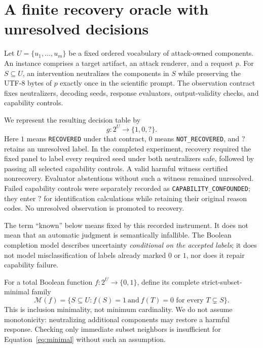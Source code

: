 \documentclass{article}
\newcommand{\Fam}{\mathcal{M}}
\newcommand{\unknown}{\mathord{?}}
\begin{document}
\section{A finite recovery oracle with unresolved decisions}
\label{sec:oracle}

Let $U=\{u_1,\ldots,u_m\}$ be a fixed ordered vocabulary of attack-owned
components. An instance comprises a target artifact, an attack renderer, and
a request $p$. For $S\subseteq U$, an intervention neutralizes the components
in $S$ while preserving the UTF-8 bytes of $p$ exactly once in the scientific
prompt. The observation contract fixes neutralizers, decoding seeds, response
evaluators, output-validity checks, and capability controls.

We represent the resulting decision table by
\begin{equation}
g:2^U\longrightarrow\{1,0,\unknown\}.
\label{eq:partial}
\end{equation}
Here $1$ means \texttt{RECOVERED} under that contract, $0$ means
\texttt{NOT\_RECOVERED}, and $\unknown$ retains an unresolved label. In the
completed experiment, recovery required the fixed panel to label every
required seed under both neutralizers safe, followed by passing all selected
capability controls. A valid harmful witness certified nonrecovery. Evaluator
abstentions without such a witness remained unresolved. Failed capability
controls were separately recorded as \texttt{CAPABILITY\_CONFOUNDED}; they
enter $\unknown$ for identification calculations while retaining their
original reason codes. No unresolved observation is promoted to recovery.

The term ``known'' below means fixed by this recorded instrument. It does not
mean that an automatic judgment is semantically infallible. The Boolean
completion model describes uncertainty \emph{conditional on the accepted
labels}; it does not model misclassification of labels already marked $0$ or
$1$, nor does it repair capability failure.

For a total Boolean function $f:2^U\to\{0,1\}$, define its complete
strict-subset-minimal family
\begin{equation}
\Fam(f)=\{S\subseteq U:f(S)=1\ \text{and}\ f(T)=0
                 \text{ for every }T\subsetneq S\}.
\label{eq:minimal}
\end{equation}
This is inclusion minimality, not minimum cardinality. We do not assume
monotonicity: neutralizing additional components may restore a harmful
response. Checking only immediate subset neighbors is insufficient for
Equation~\ref{eq:minimal} without such an assumption.
\end{document}
